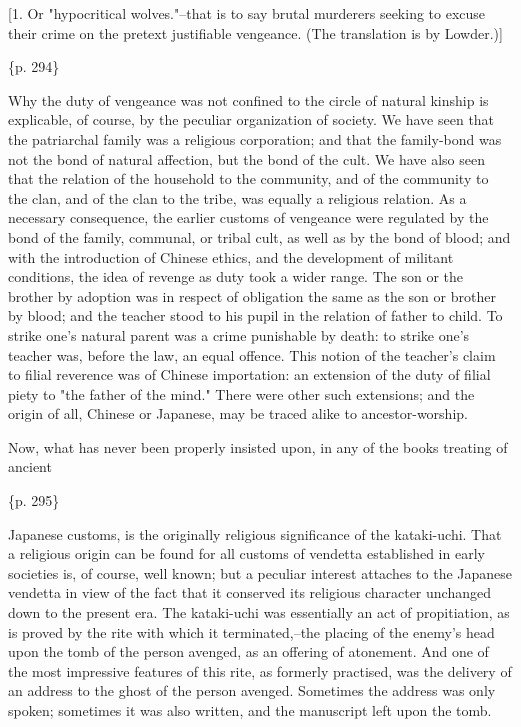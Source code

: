 [1. Or "hypocritical wolves."--that is to say brutal murderers seeking to excuse their crime on the pretext justifiable vengeance. (The translation is by Lowder.)]

\{p. 294\}

Why the duty of vengeance was not confined to the circle of natural kinship is explicable, of course, by the peculiar organization of society. We have seen that the patriarchal family was a religious corporation; and that the family-bond was not the bond of natural affection, but the bond of the cult. We have also seen that the relation of the household to the community, and of the community to the clan, and of the clan to the tribe, was equally a religious relation. As a necessary consequence, the earlier customs of vengeance were regulated by the bond of the family, communal, or tribal cult, as well as by the bond of blood; and with the introduction of Chinese ethics, and the development of militant conditions, the idea of revenge as duty took a wider range. The son or the brother by adoption was in respect of obligation the same as the son or brother by blood; and the teacher stood to his pupil in the relation of father to child. To strike one's natural parent was a crime punishable by death: to strike one's teacher was, before the law, an equal offence. This notion of the teacher's claim to filial reverence was of Chinese importation: an extension of the duty of filial piety to "the father of the mind." There were other such extensions; and the origin of all, Chinese or Japanese, may be traced alike to ancestor-worship.

Now, what has never been properly insisted upon, in any of the books treating of ancient

\{p. 295\}

Japanese customs, is the originally religious significance of the kataki-uchi. That a religious origin can be found for all customs of vendetta established in early societies is, of course, well known; but a peculiar interest attaches to the Japanese vendetta in view of the fact that it conserved its religious character unchanged down to the present era. The kataki-uchi was essentially an act of propitiation, as is proved by the rite with which it terminated,--the placing of the enemy's head upon the tomb of the person avenged, as an offering of atonement. And one of the most impressive features of this rite, as formerly practised, was the delivery of an address to the ghost of the person avenged. Sometimes the address was only spoken; sometimes it was also written, and the manuscript left upon the tomb.

